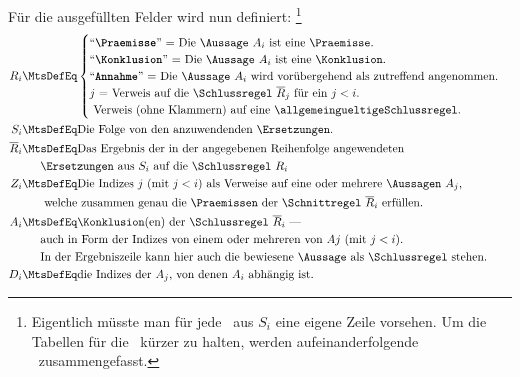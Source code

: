 {Für die ausgefüllten Felder wird nun definiert:%
\footnote{%
	Eigentlich müsste man für jede \Ersetzung\ aus $S_i$ eine eigene Zeile vorsehen.
	Um die Tabellen für die \Beweise\ kürzer zu halten, werden aufeinanderfolgende \Ersetzungen\ zusammengefasst.
}
\begin{align}
	R_i & \MtsDefEq
	\begin{cases}
		\text{\strqt{\Praemisse}  = Die \Aussage\ $A_i$ ist eine \Praemisse.}\\
		\text{\strqt{\Konklusion} = Die \Aussage\ $A_i$ ist eine \Konklusion.}\\
		\text{\strqt{Annahme}     = Die \Aussage\ $A_i$ wird vorübergehend als zutreffend angenommen.}\\
		\text{$j$                 = Verweis auf die \Schlussregel\ $\overline{R}_j$ für ein $j < i$.}\\
		\text{                      Verweis (ohne Klammern) auf eine \allgemeingueltigeSchlussregel.}
	\end{cases}
	\\
	S_i & \MtsDefEq \text{Die Folge von den anzuwendenden \Ersetzungen.}
	\\
	\overline{R}_i & \MtsDefEq \text{Das Ergebnis der in der angegebenen Reihenfolge angewendeten}\\
	& \quad\;\; \text{\Ersetzungen\ aus $S_i$ auf die \Schlussregel\ $R_i$}
	\\
	Z_i & \MtsDefEq \text{Die Indizes $j$ (mit $j < i$) als Verweise auf eine oder mehrere \Aussagen\ $A_j$,}\\
	& \quad\;\;\text{ welche zusammen genau die \Praemissen\ der \Schnittregel\ } \overline{R}_i \text{ erfüllen.}
	\\
	A_i & \MtsDefEq \text{\Konklusion(en) der \Schlussregel\ $\overline{R}_i$ ---}\\
	& \quad\;\; \text{auch in Form der Indizes von einem oder mehreren von $Aj$ (mit $j < i$).}\\
	& \quad\;\; \text{In der Ergebniszeile kann hier auch die bewiesene \Aussage\ als \Schlussregel\ stehen.}
	\\
	D_i & \MtsDefEq \text{die Indizes der $A_j$, von denen $A_i$ abhängig ist.}
\end{align}

}

